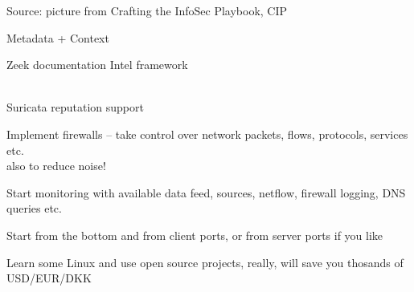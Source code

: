 \documentclass[Screen16to9,17pt]{foils}
\begin{document}


Source: picture from Crafting the InfoSec Playbook, CIP

Metadata + Context



\begin{list1}
\item Zeek documentation Intel framework\\
\\
\item Suricata reputation support\\
\end{list1}




\begin{list2}
\item Implement firewalls -- take control over network packets, flows, protocols, services etc.\\
also to reduce noise!
\item Start monitoring with available data feed, sources, netflow, firewall logging, DNS queries etc.
\item Start from the bottom and from client ports, or from server ports if you like
\item Learn some Linux and use open source projects, really, will save you thosands of USD/EUR/DKK
\end{list2}
\end{document}
